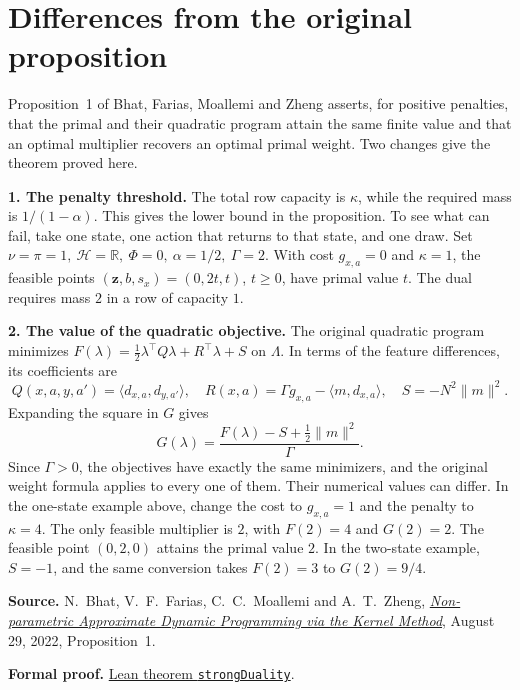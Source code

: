 \documentclass[12pt,a4paper]{article}
\newcommand{\ip}[2]{\langle #1,#2\rangle}
\newcommand{\norm}[1]{\lVert #1\rVert}
\newcommand{\R}{\mathbb R}
\newcommand{\lead}[1]{\par\smallskip\noindent\textbf{#1}\enspace}
\begin{document}
\section*{Differences from the original proposition}
Proposition~1 of Bhat, Farias, Moallemi and Zheng asserts, for positive
penalties, that the primal and their quadratic program attain the same
finite value and that an optimal multiplier recovers an optimal primal
weight. Two changes give the theorem proved here.

\lead{1. The penalty threshold.}
The total row capacity is \(\kappa\), while the required mass is \(1/(1-\alpha)\).
This gives the lower bound in the proposition. To see what can fail, take one
state, one action that returns to that state, and one draw. Set
\(\nu=\pi=1,\ \mathcal H=\R,\ \Phi=0,\ \alpha=1/2,\ \Gamma=2\).
With cost \(g_{x,a}=0\) and \(\kappa=1\), the feasible points
\((\mathbf z,b,s_x)=(0,2t,t)\), \(t\ge0\), have primal value \(t\).
The dual requires mass \(2\) in a row of capacity \(1\).

\lead{2. The value of the quadratic objective.}
The original quadratic program minimizes
\(F(\lambda)=\tfrac12\lambda^\top Q\lambda+R^\top\lambda+S\) on
\(\Lambda\). In terms of the feature differences, its coefficients are
\[
 Q(x,a,y,a')=\ip{d_{x,a}}{d_{y,a'}},\quad
 R(x,a)=\Gamma g_{x,a}-\ip{m}{d_{x,a}},\quad S=-N^2\norm{m}^2 .
\]
Expanding the square in \(G\) gives
\[
     G(\lambda)=\frac{F(\lambda)-S+\tfrac12\norm{m}^2}{\Gamma}.
\]
Since \(\Gamma>0\), the objectives have exactly the same minimizers, and
the original weight formula applies to every one of them. Their numerical
values can differ. In the one-state example above, change the cost to
\(g_{x,a}=1\) and the penalty to \(\kappa=4\). The only feasible multiplier is
\(2\), with \(F(2)=4\) and \(G(2)=2\). The feasible point \((0,2,0)\)
attains the primal value \(2\). In the two-state example, \(S=-1\), and the
same conversion takes \(F(2)=3\) to \(G(2)=9/4\).

\smallskip
{\small
\textbf{Source.} N.~Bhat, V.~F.~Farias, C.~C.~Moallemi and A.~T.~Zheng,
\href{https://moallemi.com/ciamac/papers/kernel-adp-2012.pdf\#page=8}{\emph{Non-parametric Approximate Dynamic Programming via the Kernel Method}},
August 29, 2022, Proposition~1.\par
\textbf{Formal proof.} \href{https://github.com/nikhilpb/kadp/blob/main/lean/PrimalAttainment.lean}{Lean theorem \texttt{strongDuality}}.
}
\end{document}
